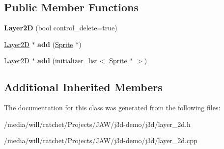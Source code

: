 \subsection*{Public Member Functions}
\begin{DoxyCompactItemize}
\item 
\hypertarget{classj3d_1_1Layer2D_a6f9a278af6814d14162c85bc71f0daec}{}{\bfseries Layer2\+D} (bool control\+\_\+delete=true)\label{classj3d_1_1Layer2D_a6f9a278af6814d14162c85bc71f0daec}

\item 
\hypertarget{classj3d_1_1Layer2D_ae6999e2c08f1adee67ab904836bb563f}{}\hyperlink{classj3d_1_1Layer2D}{Layer2\+D} $\ast$ {\bfseries add} (\hyperlink{classj3d_1_1Sprite}{Sprite} $\ast$)\label{classj3d_1_1Layer2D_ae6999e2c08f1adee67ab904836bb563f}

\item 
\hypertarget{classj3d_1_1Layer2D_a3172565d286e5978c35bf29a6919d483}{}\hyperlink{classj3d_1_1Layer2D}{Layer2\+D} $\ast$ {\bfseries add} (initializer\+\_\+list$<$ \hyperlink{classj3d_1_1Sprite}{Sprite} $\ast$ $>$)\label{classj3d_1_1Layer2D_a3172565d286e5978c35bf29a6919d483}

\end{DoxyCompactItemize}
\subsection*{Additional Inherited Members}


The documentation for this class was generated from the following files\+:\begin{DoxyCompactItemize}
\item 
/media/will/ratchet/\+Projects/\+J\+A\+W/j3d-\/demo/j3d/layer\+\_\+2d.\+h\item 
/media/will/ratchet/\+Projects/\+J\+A\+W/j3d-\/demo/j3d/layer\+\_\+2d.\+cpp\end{DoxyCompactItemize}
